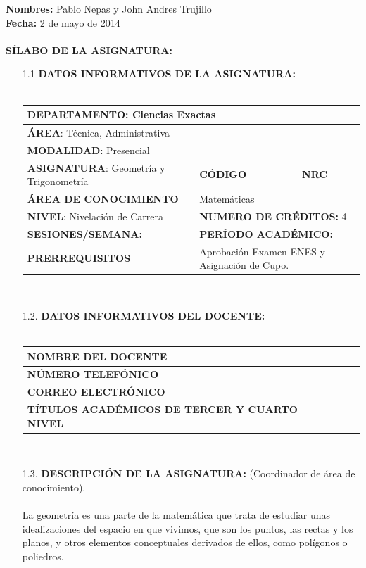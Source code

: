 \documentclass[10pt,a4paper]{article}
\author{Pablo Nepas y John Andres Trujillo}
\begin{document}
{\bf Nombres:} Pablo Nepas y John Andres Trujillo\\
  {\bf Fecha:} 2 de mayo de 2014\\\\
{\bf {\blue SÍLABO DE LA ASIGNATURA:}}\\
\begin{enumerate}
	\item [1.1]	{\bf DATOS INFORMATIVOS DE LA ASIGNATURA:}\\\\
\noindent
\begin{tabularx}{\textwidth}{|X|X|X|}
\hline
\multicolumn{3}{|l|}{{\bf DEPARTAMENTO}: Ciencias Exactas}\\\hline
\multicolumn{3}{|l|}{{\bf ÁREA}: Técnica, Administrativa }\\\hline
\multicolumn{3}{|l|}{{\bf MODALIDAD}:  Presencial}\\\hline
{\bf ASIGNATURA}: Geometría y Trigonometría&{\bf CÓDIGO}&{\bf NRC}\\\hline
{\bf ÁREA DE CONOCIMIENTO}&\multicolumn{2}{l|}{Matemáticas}\\\hline
{\bf NIVEL}: Nivelación de Carrera&\multicolumn{2}{l|}{{\bf NUMERO DE CRÉDITOS:} 4}\\\hline
{\bf SESIONES/SEMANA: }&\multicolumn{2}{l|}{\bf PERÍODO ACADÉMICO: }\\\hline
{\bf PRERREQUISITOS }&\multicolumn{2}{l|}{Aprobación Examen ENES y Asignación de Cupo. }\\\hline

\end{tabularx}\\

\item [1.2.]	{\bf DATOS INFORMATIVOS DEL DOCENTE:}\\\\
\noindent
\begin{tabularx}{\textwidth}{|p{5.2cm}|X | X|}
\hline
{\bf NOMBRE DEL DOCENTE}&\\\hline
{\bf NÚMERO TELEFÓNICO}&\\\hline
{\bf CORREO ELECTRÓNICO}&\\\hline
{\bf TÍTULOS ACADÉMICOS DE TERCER  Y CUARTO NIVEL}&\\\hline

\end{tabularx}\\
\item[1.3.] {\bf DESCRIPCIÓN DE LA ASIGNATURA:} (Coordinador de área de conocimiento).\\\\
La geometría es una parte de la matemática que trata de estudiar unas idealizaciones del espacio en que vivimos, que son los puntos, las rectas y los planos, y otros elementos conceptuales derivados de ellos, como polígonos o poliedros.\\


\end{enumerate}
\end{document}

